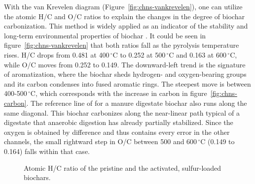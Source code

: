 With the van Krevelen diagram (Figure~\ref{fig:chns-vankrevelen}), one can utilize the atomic H/C and O/C ratios to explain the changes in the degree of biochar carbonization. This method is widely applied as an indicator of the stability and long-term environmental properties of biochar \cite{kumar-2024}. It could be seen in figure~\ref{fig:chns-vankrevelen} that both ratios fall as the pyrolysis temperature rises. H/C drops from 0.481 at 400\,$^{\circ}$C to 0.252 at 500\,$^{\circ}$C and 0.163 at 600\,$^{\circ}$C, while O/C moves from 0.252 to 0.149. The downward-left trend is the signature of aromatization, where the biochar sheds hydrogen- and oxygen-bearing groups and its carbon condenses into fused aromatic rings. The steepest move is between 400-500\,$^{\circ}$C, which corresponds with the increase in carbon in figure~\ref{fig:chns-carbon}. The reference line of \textcite{kujawska-2026} for a manure digestate biochar also runs along the same diagonal. This biochar carbonizes along the near-linear path typical of a digestate that anaerobic digestion has already partially stabilized.
Since the oxygen is obtained by difference and thus contains every error in the other channels, the small rightward step in O/C between 500 and 600\,$^{\circ}$C (0.149 to 0.164) falls within that case. 

\begin{figure}[ht]
\centering
{}
\caption{Atomic H/C ratio of the pristine and the activated, sulfur-loaded biochars.}
\label{fig:chns-hc-loaded}
\end{figure}




